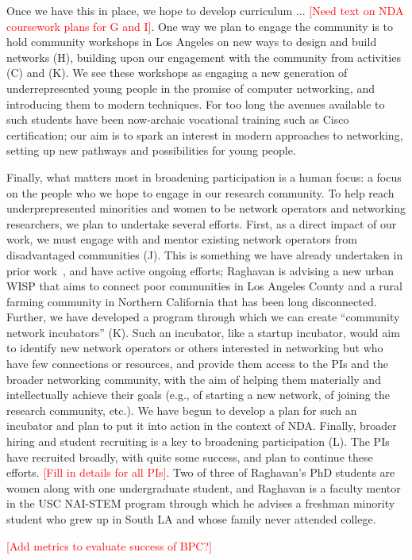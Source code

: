 \documentclass[10pt]{article}
\newcommand{\todo}[1]{\textcolor{red}{[#1]}}
\begin{document}
Once we have this in place, we hope to develop curriculum ... \todo{Need text on NDA coursework plans for G and I}.
One way we plan to engage the community is to hold community workshops in Los Angeles on new ways to design and build networks (H), building upon our engagement with the community from activities (C) and (K).  We see these workshops as engaging a new generation of underrepresented young people in the promise of computer networking, and introducing them to modern techniques.  For too long the avenues available to such students have been now-archaic vocational training such as Cisco certification; our aim is to spark an interest in modern approaches to networking, setting up new pathways and possibilities for young people.

Finally, what matters most in broadening participation is a human focus: a focus on the people who we hope to engage in our research community.  To help reach underprepresented minorities and women to be network operators and networking researchers, we plan to undertake several efforts.  First, as a direct impact of our work, we must engage with and mentor existing network operators from disadvantaged communities (J).  This is something we have already undertaken in prior work~\cite{wispbarath}, and have active ongoing efforts; Raghavan is advising a new urban WISP that aims to connect poor communities in Los Angeles County and a rural farming community in Northern California that has been long disconnected.  Further, we have developed a program through which we can create ``community network incubators'' (K).  Such an incubator, like a startup incubator, would aim to identify new network operators or others interested in networking but who have few connections or resources, and provide them access to the PIs and the broader networking community, with the aim of helping them materially and intellectually achieve their goals (e.g., of starting a new network, of joining the research community, etc.).  We have begun to develop a plan for such an incubator and plan to put it into action in the context of NDA.
Finally, broader hiring and student recruiting is a key to broadening participation (L).  The PIs have recruited broadly, with quite some success, and plan to continue these efforts. \todo{Fill in details for all PIs}.  Two of three of Raghavan's PhD students are women along with one undergraduate student, and Raghavan is a faculty mentor in the USC NAI-STEM program through which he advises a freshman minority student who grew up in South LA and whose family never attended college.

\todo{Add metrics to evaluate success of BPC?}
\end{document}
